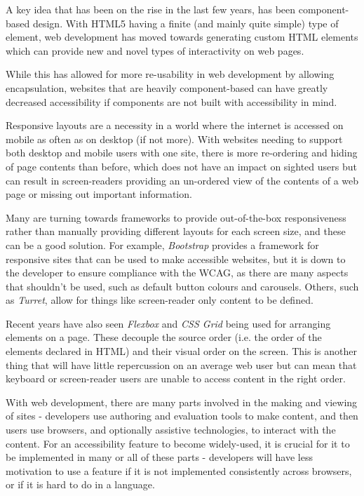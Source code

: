 \documentclass[ %
                    author={Aleena Baig},
                supervisor={Dr Simon Lock},
                    degree={BSc},
                     title={On Making Web Accessible Graphs},
                  subtitle={},
                      year={2019} ]{dissertation}
\begin{document}
A key idea that has been on the rise in the last few years, has been component-based design. With HTML5 having a finite (and mainly quite simple) type of element, web development has moved towards generating custom HTML elements which can provide new and novel types of interactivity on web pages.

While this has allowed for more re-usability in web development by allowing encapsulation, websites that are heavily component-based can have greatly decreased accessibility if components are not built with accessibility in mind.

Responsive layouts are a necessity in a world where the internet is accessed on mobile as often as on desktop (if not more).\cite{mobileusestudy} With websites needing to support both desktop and mobile users with one site, there is more re-ordering and hiding of page contents than before, which does not have an impact on sighted users but can result in screen-readers providing an un-ordered view of the contents of a web page or missing out important information.

Many are turning towards frameworks to provide out-of-the-box responsiveness rather than manually providing different layouts for each screen size, and these can be a good solution. For example, \textit{Bootstrap} provides a framework for responsive sites that can be used to make accessible websites, but it is down to the developer to ensure compliance with the WCAG, as there are many aspects that shouldn't be used, such as default button colours and carousels.\cite{bootstrapaccessibility} Others, such as \textit{Turret}, allow for things like screen-reader only content to be defined.\cite{turretaccessibility}

Recent years have also seen \textit{Flexbox} and \textit{CSS Grid} being used for arranging elements on a page. These decouple the source order (i.e. the order of the elements declared in HTML) and their visual order on the screen. This is another thing that will have little repercussion on an average web user but can mean that keyboard or screen-reader users are unable to access content in the right order.

With web development, there are many parts involved in the making and viewing of sites - developers use authoring and evaluation tools to make content, and then users use browsers, and optionally assistive technologies, to interact with the content. For an accessibility feature to become widely-used, it is crucial for it to be implemented in many or all of these parts - developers will have less motivation to use a feature if it is not implemented consistently across browsers, or if it is hard to do in a language.
\end{document}
